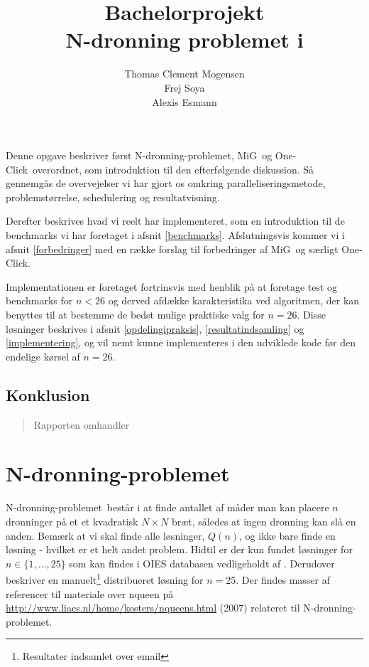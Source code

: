 \documentclass[draft,a4paper,11pt]{article}
\title{Bachelorprojekt\\N-dronning problemet i \mig}
\author{Thomas Clement Mogensen \\ Frej Soya \\ Alexis Esmann }
\newcommand{\mig}{MiG}
\newcommand{\oc}{One-Click}
\newcommand{\nq}{N-dronning-problemet}
\renewcommand{\thepage}{\roman{page}}
\begin{document}
\maketitle
\tableofcontents
\listoffixmes
\newpage

\renewcommand{\thepage}{\arabic{page}}
\pagestyle{fancy}                              %
\fancyhead[R]{\thepage\ af \pageref{LastPage}} %
\fancyhead[L]{\nq\ i \mig}              %
\fancyfoot[C]{}                                %
\setcounter{page}{1}

\abstract
Denne opgave beskriver først \nq, \mig\ og \oc\ overordnet, som introduktion til den efterfølgende diskussion. Så gennemgås de overvejelser vi har gjort os omkring paralleliseringsmetode, problemstørrelse, schedulering og resultatvisning. 

Derefter beskrives hvad vi reelt har implementeret, som en introduktion til de benchmarks vi har foretaget i afsnit \ref{benchmarks}. 
Afslutningsvis kommer vi i afsnit \ref{forbedringer} med en række forslag til forbedringer af \mig\ og særligt \oc.

Implementationen er foretaget fortrinsvis med henblik på at foretage test og benchmarks for $n<26$ og derved afdække karakteristika ved algoritmen, der kan benyttes til at bestemme de bedst mulige praktiske valg for $n=26$. Disse løsninger beskrives i afsnit \ref{opdelingipraksis}, \ref{resultatindsamling} og \ref{implementering}, og vil nemt kunne implementeres i den udviklede kode før den endelige kørsel af $n=26$.

\subsection*{Konklusion}\label{konklusion}
\begin{verse}
 Rapporten omhandler
\end{verse}

\section{\nq}\label{nqueenproblemet}

\nq\ består i at finde antallet af måder man kan placere $n$ dronninger på et et kvadratisk $N \times N$ bræt, således at ingen dronning kan slå en anden. Bemærk at vi skal finde alle løsninger, $Q(n)$, og ikke bare finde en løsning - hvilket er et helt andet problem. Hidtil er der kun fundet løsninger for $n \in \{1,...,25\}$ som kan findes i OIES databasen vedligeholdt af \citep{sekvenser}. Derudover beskriver \cite{etsi} en manuelt\footnote{Resultater indsamlet over email} distribueret løsning for $n=25$. Der findes masser af referencer til materiale over nqueen på \url{http://www.liacs.nl/home/kosters/nqueens.html} (2007) relateret til \nq. 
\end{document}
